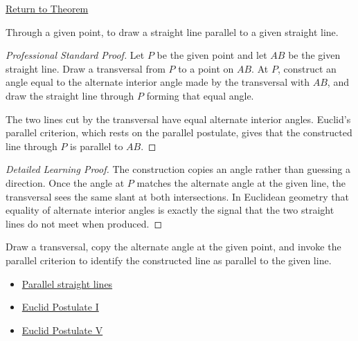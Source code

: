 \newpage
{}
\label{prf:euclid-i-31}

\begin{remark*}[Return]
\hyperref[thm:euclid-i-31]{Return to Theorem}
\end{remark*}

\begin{theorem*}
Through a given point, to draw a straight line parallel to a given straight
line.
\end{theorem*}



\begin{proof}[Professional Standard Proof]
\LRAProofBodyStart
Let $P$ be the given point and let $AB$ be the given straight line. Draw a
transversal from $P$ to a point on $AB$. At $P$, construct an angle equal to
the alternate interior angle made by the transversal with $AB$, and draw the
straight line through $P$ forming that equal angle.

The two lines cut by the transversal have equal alternate interior angles.
Euclid's parallel criterion, which rests on the parallel postulate, gives that
the constructed line through $P$ is parallel to $AB$.
\end{proof}

\begin{proof}[Detailed Learning Proof]
\LRAProofBodyStart
The construction copies an angle rather than guessing a direction. Once the
angle at $P$ matches the alternate angle at the given line, the transversal
sees the same slant at both intersections. In Euclidean geometry that equality
of alternate interior angles is exactly the signal that the two straight lines
do not meet when produced.
\end{proof}

\begin{remark*}
Draw a transversal, copy the alternate angle at the given point, and invoke the
parallel criterion to identify the constructed line as parallel to the given
line.
\end{remark*}

\begin{dependencies}
\begin{itemize}
  \item \hyperref[def:euclid-parallel-straight-lines]{Parallel straight lines}
  \item \hyperref[ax:euclid-postulate-draw-straight-line]{Euclid Postulate I}
  \item \hyperref[ax:euclid-postulate-parallel]{Euclid Postulate V}
\end{itemize}
\end{dependencies}

\clearpage
